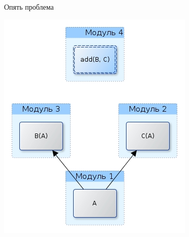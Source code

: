 \documentclass{article}
\begin{document}
\begin{center} Опять проблема \end{center}
    \begin{center} \includegraphics[scale=0.9]{images/virtual_problem.jpg} \end{center}
\newpage
\end{document}
